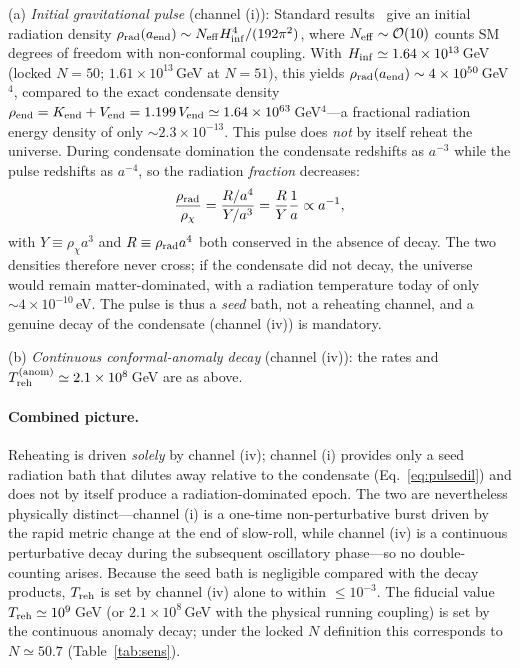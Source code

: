 \documentclass[pdflatex,sn-mathphys-num]{sn-jnl}
\providecommand{\lesssim}{\leq}
\theoremstyle{thmstyleone}
\begin{document}
(a) \emph{Initial gravitational pulse} (channel (i)): Standard results~\cite{Ford1982,BirrellDavies} give an initial radiation density $\rho_{\rm rad}(a_{\rm end})\sim N_{\rm eff}H_{\rm inf}^4/(192\pi^2)$, where $N_{\rm eff}\sim\mathcal{O}(10)$ counts SM degrees of freedom with non-conformal coupling. With $H_{\rm inf}\simeq1.64\times10^{13}\,$GeV (locked $N=50$; $1.61\times10^{13}\,$GeV at $N=51$), this yields $\rho_{\rm rad}(a_{\rm end})\sim4\times10^{50}\,$GeV$^4$, compared to the exact condensate density $\rho_{\rm end}=K_{\rm end}+V_{\rm end}=1.199\,V_{\rm end}\simeq1.64\times10^{63}\,$GeV$^4$---a fractional radiation energy density of only $\sim2.3\times10^{-13}$. This pulse does \emph{not} by itself reheat the universe. During condensate domination the condensate redshifts as $a^{-3}$ while the pulse redshifts as $a^{-4}$, so the radiation \emph{fraction} decreases:
\begin{equation}
\frac{\rho_{\rm rad}}{\rho_\chi}=\frac{R/a^4}{Y/a^3}=\frac{R}{Y}\frac{1}{a}\propto a^{-1},
\label{eq:pulsedil}
\end{equation}
with $Y\equiv\rho_\chi a^3$ and $R\equiv\rho_{\rm rad}a^4$ both conserved in the absence of decay. The two densities therefore never cross; if the condensate did not decay, the universe would remain matter-dominated, with a radiation temperature today of only $\sim4\times10^{-10}\,$eV. The pulse is thus a \emph{seed} bath, not a reheating channel, and a genuine decay of the condensate (channel (iv)) is mandatory. 

(b) \emph{Continuous conformal-anomaly decay} (channel (iv)): the rates and $T_{\rm reh}^{\rm (anom)}\simeq2.1\times10^8\,$GeV are as above.

\paragraph{Combined picture.} Reheating is driven \emph{solely} by channel (iv); channel (i) provides only a seed radiation bath that dilutes away relative to the condensate (Eq.~\eqref{eq:pulsedil}) and does not by itself produce a radiation-dominated epoch. The two are nevertheless physically distinct---channel (i) is a one-time non-perturbative burst driven by the rapid metric change at the end of slow-roll, while channel (iv) is a continuous perturbative decay during the subsequent oscillatory phase---so no double-counting arises. Because the seed bath is negligible compared with the decay products, $T_{\rm reh}$ is set by channel (iv) alone to within $\lesssim10^{-3}$. The fiducial value $T_{\rm reh}\simeq10^9\,$GeV (or $2.1\times10^8\,$GeV with the physical running coupling) is set by the continuous anomaly decay; under the locked $N$ definition this corresponds to $N\simeq50.7$ (Table~\ref{tab:sens}).
\end{document}
